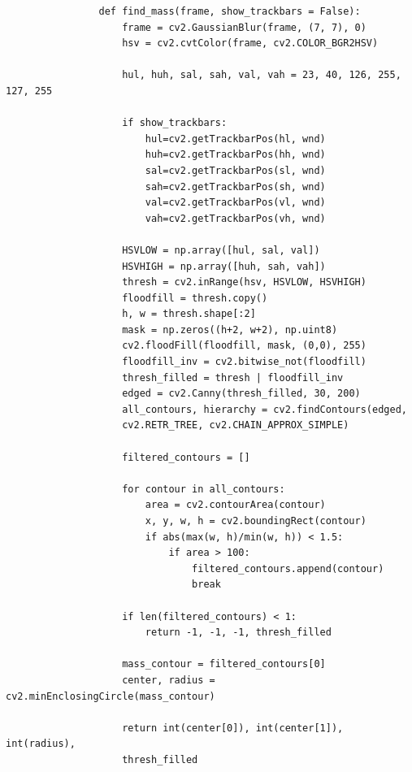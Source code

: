 \documentclass[11pt]{article}
\begin{document}
            \begin{verbatim}
                def find_mass(frame, show_trackbars = False):
                    frame = cv2.GaussianBlur(frame, (7, 7), 0)
                    hsv = cv2.cvtColor(frame, cv2.COLOR_BGR2HSV)

                    hul, huh, sal, sah, val, vah = 23, 40, 126, 255, 127, 255 

                    if show_trackbars:
                        hul=cv2.getTrackbarPos(hl, wnd)
                        huh=cv2.getTrackbarPos(hh, wnd)
                        sal=cv2.getTrackbarPos(sl, wnd)
                        sah=cv2.getTrackbarPos(sh, wnd)
                        val=cv2.getTrackbarPos(vl, wnd)
                        vah=cv2.getTrackbarPos(vh, wnd)

                    HSVLOW = np.array([hul, sal, val])
                    HSVHIGH = np.array([huh, sah, vah])
                    thresh = cv2.inRange(hsv, HSVLOW, HSVHIGH)
                    floodfill = thresh.copy()
                    h, w = thresh.shape[:2]
                    mask = np.zeros((h+2, w+2), np.uint8)
                    cv2.floodFill(floodfill, mask, (0,0), 255)
                    floodfill_inv = cv2.bitwise_not(floodfill)
                    thresh_filled = thresh | floodfill_inv    
                    edged = cv2.Canny(thresh_filled, 30, 200)
                    all_contours, hierarchy = cv2.findContours(edged, 
                    cv2.RETR_TREE, cv2.CHAIN_APPROX_SIMPLE)

                    filtered_contours = []

                    for contour in all_contours:
                        area = cv2.contourArea(contour)
                        x, y, w, h = cv2.boundingRect(contour)
                        if abs(max(w, h)/min(w, h)) < 1.5:
                            if area > 100:
                                filtered_contours.append(contour) 
                                break

                    if len(filtered_contours) < 1:
                        return -1, -1, -1, thresh_filled

                    mass_contour = filtered_contours[0]
                    center, radius = cv2.minEnclosingCircle(mass_contour)
                    
                    return int(center[0]), int(center[1]), int(radius), 
                    thresh_filled
    \end{verbatim}
\end{document}
